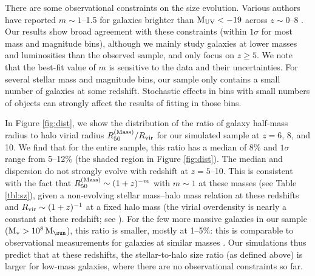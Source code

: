 \documentclass[useAMS,usenatbib]{mn2e}
\newcommand{\Rvir}{R_{\rm vir}}
\newcommand{\Ms}{{\rm M}_{\ast}}
\newcommand{\Msun}{{\rm M}_{\sun}}
\newcommand{\referee}[1]{{\color{black}#1}}
\begin{document}
There are some observational constraints on the size evolution. Various authors have reported $m\sim1$--1.5 for galaxies brighter than $\rm M_{UV}<-19$ across $z\sim0$--8 \citep[e.g.][]{bouwens.2004:hudf.size.evolution,oesch.2010:hudf.morphology,kawamata.2015:hff.size.z6to8,shibuya.2015:legacy.size.evolution}. Our results show broad agreement with these constraints (within $1\sigma$ for most mass and magnitude bins), although we mainly study galaxies at lower masses and luminosities than the observed sample, and only focus on $z\geq5$. We note that the best-fit value of $m$ is sensitive to the data and their uncertainties. For several stellar mass and magnitude bins, our sample only contains a small number of galaxies at some redshift. Stochastic effects in bins with small numbers of objects can strongly affect the results of fitting in those bins.

\referee{In Figure \ref{fig:dist}, we show the distribution of the ratio of galaxy half-mass radius to halo virial radius $R_{50}^{\rm (Mass)}/R_{\rm vir}$ for our simulated sample at $z=6$, 8, and 10.} We find that for the entire sample, this ratio has a median of 8\% and $1\sigma$ range from 5--12\% (the shaded region in Figure \ref{fig:dist}). The median and dispersion do not strongly evolve with redshift at $z=5$--10. This is consistent with the fact that $R_{50}^{\rm (Mass)}\sim(1+z)^{-m}$ with $m\sim1$ at these masses (see Table \ref{tbl:sz}), given a non-evolving stellar mass--halo mass relation at these redshifts \citep{ma.2017:fire.hiz.smf} and $\Rvir\sim(1+z)^{-1}$ at a fixed halo mass (the virial overdensity is nearly a constant at these redshift; see \citealt{bryan.norman.1998:xray.cluster}). For the few more massive galaxies in our sample ($\Ms>10^8\,\Msun$), this ratio is smaller, mostly at 1--5\%: this is comparable to observational measurements for galaxies at similar masses \citep[$\sim3\%$, e.g.][]{kawamata.2015:hff.size.z6to8,shibuya.2015:legacy.size.evolution}. Our simulations thus predict that at these redshifts, the stellar-to-halo size ratio (as defined above) is larger for low-mass galaxies, where there are no observational constraints so far.
\end{document}
